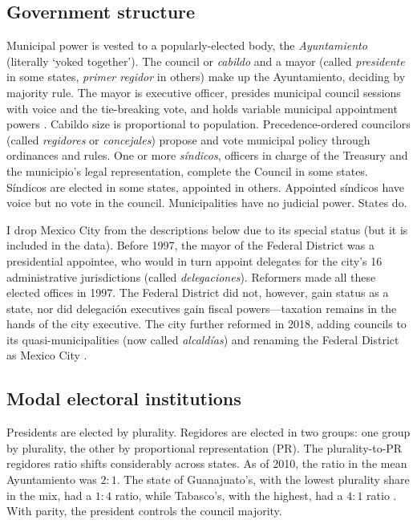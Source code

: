 \documentclass[letter,12pt]{article}
\begin{document}
\subsection{Government structure}
Municipal power is vested to a popularly-elected body, the \emph{Ayuntamiento} (literally `yoked together'). The council or \emph{cabildo} and a mayor (called \emph{presidente} in some states, \emph{primer regidor} in others) make up the Ayuntamiento, deciding by majority rule. The mayor is executive officer, presides municipal council sessions with voice and the tie-breaking vote, and holds variable municipal appointment powers \citep{robles-mtz.Municipio.2009, rmz-millan.2000}. Cabildo size is proportional to population. Precedence-ordered councilors (called \emph{regidores} or \emph{concejales}) propose and vote municipal policy through ordinances and rules. One or more \emph{síndicos}, officers in charge of the Treasury and the municipio's legal representation, complete the Council in some states. Síndicos are elected in some states, appointed in others. Appointed síndicos have voice but no vote in the council. Municipalities have no judicial power. States do.

I drop Mexico City from the descriptions below due to its special status (but it is included in the data). Before 1997, the mayor of the Federal District was a presidential appointee, who would in turn appoint delegates for the city's 16 administrative jurisdictions (called \emph{delegaciones}). Reformers made all these elected offices in 1997. The Federal District did not, however, gain status as a state, nor did delegación executives gain fiscal powers---taxation remains in the hands of the city executive. The city further reformed in 2018, adding councils to its quasi-municipalities (now called \emph{alcaldías}) and renaming the Federal District as Mexico City \citep{rabell.2017}. 

\subsection{Modal electoral institutions}
Presidents are elected by plurality. Regidores are elected in two groups: one group by plurality, the other by proportional representation (PR). The plurality-to-PR regidores ratio shifts considerably across states. As of 2010, the ratio in the mean Ayuntamiento was $2:1$. The state of Guanajuato's, with the lowest plurality share in the mix, had a $1:4$ ratio, while Tabasco's, with the highest, had a $4:1$ ratio \citep[][:14]{gil.2010}. With parity, the president controls the council majority.
\end{document}
